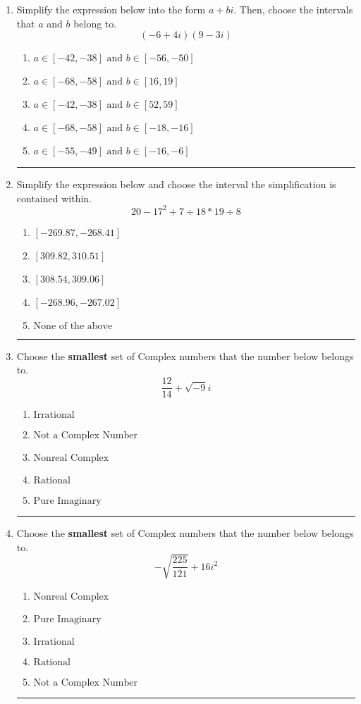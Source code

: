 \documentclass[14pt]{extbook}
\newcommand{\litem}[1]{\item#1\hspace*{-1cm}\rule{\textwidth}{0.4pt}}
\begin{document}
\begin{enumerate}
{\begin{enumerate}[label=\Alph*.]
\end{enumerate} }
\litem{
Simplify the expression below into the form $a+bi$. Then, choose the intervals that $a$ and $b$ belong to.\[ (-6 + 4 i)(9 - 3 i) \]\begin{enumerate}[label=\Alph*.]
\item \( a \in [-42, -38] \text{ and } b \in [-56, -50] \)
\item \( a \in [-68, -58] \text{ and } b \in [16, 19] \)
\item \( a \in [-42, -38] \text{ and } b \in [52, 59] \)
\item \( a \in [-68, -58] \text{ and } b \in [-18, -16] \)
\item \( a \in [-55, -49] \text{ and } b \in [-16, -6] \)

\end{enumerate} }
\litem{
Simplify the expression below and choose the interval the simplification is contained within.\[ 20 - 17^2 + 7 \div 18 * 19 \div 8 \]\begin{enumerate}[label=\Alph*.]
\item \( [-269.87, -268.41] \)
\item \( [309.82, 310.51] \)
\item \( [308.54, 309.06] \)
\item \( [-268.96, -267.02] \)
\item \( \text{None of the above} \)

\end{enumerate} }
\litem{
Choose the \textbf{smallest} set of Complex numbers that the number below belongs to.\[ \frac{12}{14}+\sqrt{-9}i \]\begin{enumerate}[label=\Alph*.]
\item \( \text{Irrational} \)
\item \( \text{Not a Complex Number} \)
\item \( \text{Nonreal Complex} \)
\item \( \text{Rational} \)
\item \( \text{Pure Imaginary} \)

\end{enumerate} }
\litem{
Choose the \textbf{smallest} set of Complex numbers that the number below belongs to.\[ -\sqrt{\frac{225}{121}} + 16i^2 \]\begin{enumerate}[label=\Alph*.]
\item \( \text{Nonreal Complex} \)
\item \( \text{Pure Imaginary} \)
\item \( \text{Irrational} \)
\item \( \text{Rational} \)
\item \( \text{Not a Complex Number} \)


\end{enumerate}}
\end{enumerate}
\end{document}
